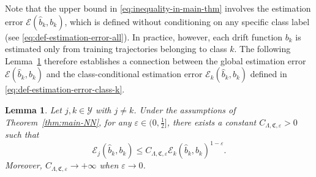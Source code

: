 \documentclass{article}
\theoremstyle{plain}
\newtheorem{lemma}[theorem]{Lemma}
\theoremstyle{definition}
\theoremstyle{remark}
\newcommand{\calY}{\mathcal{Y}}
\begin{document}
Note that the upper bound in \eqref{eq:inequality-in-main-thm} involves the
estimation error \(\mathcal{E}(\widehat b_k, b_k)\), which is defined without
conditioning on any specific class label (see \eqref{eq:def-estimation-error-all}). In practice, however, each drift
function \(b_k\) is estimated only from training trajectories belonging to
class \(k\).
The following Lemma~\ref{lem:relation-E-with-Ek} therefore establishes a
connection between the global estimation error
\(\mathcal{E}(\widehat b_k, b_k)\) and the class-conditional estimation error
\(\mathcal{E}_k(\widehat b_k, b_k)\) defined in
\eqref{eq:def-estimation-error-class-k}.


\begin{lemma}\label{lem:relation-E-with-Ek} Let $j,k\in\calY$ with $j\neq k$. 
Under the assumptions of Theorem~\ref{thm:main-NN}, for any $\varepsilon\in(0,\frac{1}{2}]$, there exists a constant
$C_{\Lambda,\mathfrak{C},\varepsilon}>0$ such that
\[
\mathcal{E}_j(\widehat b_k,b_k)\leq C_{\Lambda, \mathfrak{C}, \varepsilon}\mathcal{E}_k(\widehat b_k,b_k)^{1-\varepsilon}. 
\]
Moreover, $C_{\Lambda, \mathfrak{C}, \varepsilon}\rightarrow+\infty$ when $\varepsilon\rightarrow 0$. 
\end{lemma}
\end{document}

